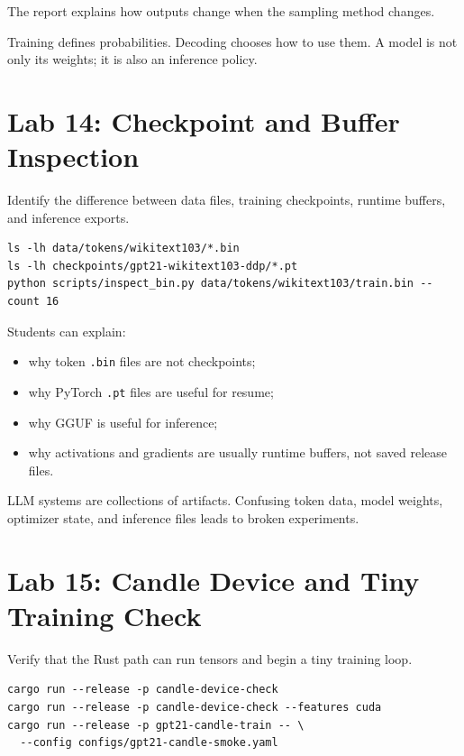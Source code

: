  The report explains how outputs change when the sampling method changes.

 Training defines probabilities. Decoding chooses how to use them. A model is not only its weights; it is also an inference policy.

\section{Lab 14: Checkpoint and Buffer Inspection}

 Identify the difference between data files, training checkpoints, runtime buffers, and inference exports.


\begin{lstlisting}
ls -lh data/tokens/wikitext103/*.bin
ls -lh checkpoints/gpt21-wikitext103-ddp/*.pt
python scripts/inspect_bin.py data/tokens/wikitext103/train.bin --count 16
\end{lstlisting}

 Students can explain:

\begin{itemize}
  \item why token \texttt{.bin} files are not checkpoints;
  \item why PyTorch \texttt{.pt} files are useful for resume;
  \item why GGUF is useful for inference;
  \item why activations and gradients are usually runtime buffers, not saved release files.
\end{itemize}

 LLM systems are collections of artifacts. Confusing token data, model weights, optimizer state, and inference files leads to broken experiments.

\section{Lab 15: Candle Device and Tiny Training Check}

 Verify that the Rust path can run tensors and begin a tiny training loop.


\begin{lstlisting}
cargo run --release -p candle-device-check
cargo run --release -p candle-device-check --features cuda
cargo run --release -p gpt21-candle-train -- \
  --config configs/gpt21-candle-smoke.yaml
\end{lstlisting}

